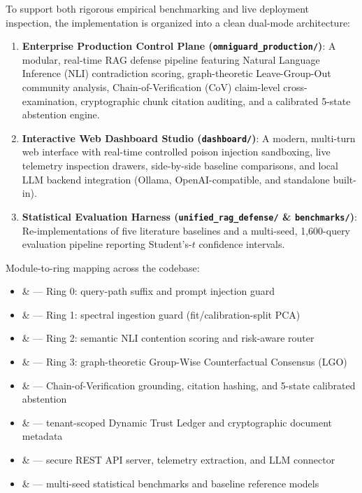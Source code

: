 To support both rigorous empirical benchmarking and live deployment
inspection, the implementation is organized into a clean dual-mode
architecture:

\begin{enumerate}
\item \textbf{Enterprise Production Control Plane (\texttt{omniguard\_production/})}:
  A modular, real-time RAG defense pipeline featuring Natural Language
  Inference (NLI) contradiction scoring, graph-theoretic Leave-Group-Out
  community analysis, Chain-of-Verification (CoV) claim-level cross-examination,
  cryptographic chunk citation auditing, and a calibrated 5-state abstention
  engine.
\item \textbf{Interactive Web Dashboard Studio (\texttt{dashboard/})}:
  A modern, multi-turn web interface with real-time controlled poison injection
  sandboxing, live telemetry inspection drawers, side-by-side baseline
  comparisons, and local LLM backend integration (Ollama, OpenAI-compatible,
  and standalone built-in).
\item \textbf{Statistical Evaluation Harness (\texttt{unified\_rag\_defense/} \& \texttt{benchmarks/})}:
  Re-implementations of five literature baselines and a multi-seed,
  1,600-query evaluation pipeline reporting Student's-$t$ confidence
  intervals.
\end{enumerate}

Module-to-ring mapping across the codebase:

\begin{itemize}
\item {} \&  --- Ring 0: query-path suffix and prompt injection guard
\item {} \&  --- Ring 1: spectral ingestion guard (fit/calibration-split PCA)
\item {} \&  --- Ring 2: semantic NLI contention scoring and risk-aware router
\item {} \&  --- Ring 3: graph-theoretic Group-Wise Counterfactual Consensus (LGO)
\item {} \&  --- Chain-of-Verification grounding, citation hashing, and 5-state calibrated abstention
\item {} \&  --- tenant-scoped Dynamic Trust Ledger and cryptographic document metadata
\item {} \&  --- secure REST API server, telemetry extraction, and LLM connector
\item {} \&  --- multi-seed statistical benchmarks and baseline reference models
\end{itemize}

